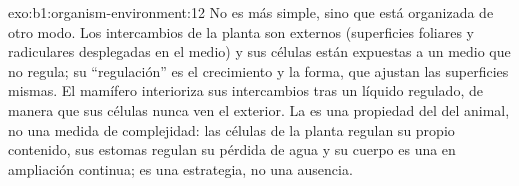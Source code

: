 \begin{solution}{exo:b1:organism-environment:12}
No es más simple, sino que está organizada de otro modo. Los intercambios de
la planta son externos (superficies foliares y radiculares desplegadas en el
medio) y sus células están expuestas a un medio que no regula; su
``regulación'' es el crecimiento y la forma, que ajustan las superficies
mismas. El mamífero interioriza sus intercambios tras un líquido regulado,
de manera que sus células nunca ven el exterior. La  es una
propiedad del  del animal, no una medida de complejidad: las
células de la planta regulan su propio contenido, sus estomas regulan su
pérdida de agua y su cuerpo es una  en ampliación
continua; es una estrategia, no una ausencia.
\end{solution}

